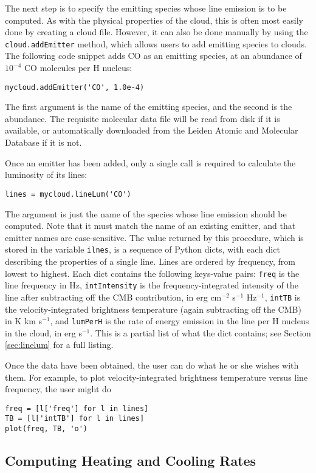 \documentclass[12pt]{article}
\begin{document}
The next step is to specify the emitting species whose line emission is to be computed. As with the physical properties of the cloud, this is often most easily done by creating a cloud file. However, it can also be done manually by using the \verb=cloud.addEmitter= method, which allows users to add emitting species to clouds. The following code snippet adds CO as an emitting species, at an abundance of $10^{-4}$ CO molecules per H nucleus:
\begin{verbatim}
mycloud.addEmitter('CO', 1.0e-4)
\end{verbatim}
The first argument is the name of the emitting species, and the second is the abundance. The requisite molecular data file will be read from disk if it is available, or automatically downloaded from the Leiden Atomic and Molecular Database if it is not.

Once an emitter has been added, only a single call is required to calculate the luminosity of its lines:
\begin{verbatim}
lines = mycloud.lineLum('CO')
\end{verbatim}
The argument is just the name of the species whose line emission should be computed. Note that it must match the name of an existing emitter, and that emitter names are case-sensitive. The value returned by this procedure, which is stored in the variable \verb=ilnes=, is a sequence of Python dicts, with each dict describing the properties of a single line. Lines are ordered by frequency, from lowest to highest. Each dict contains the following keys-value pairs: \verb=freq= is the line frequency in Hz, \verb=intIntensity= is the frequency-integrated intensity of the line after subtracting off the CMB contribution, in erg cm$^{-2}$ s$^{-1}$ Hz$^{-1}$, \verb=intTB= is the velocity-integrated brightness temperature (again subtracting off the CMB) in K km s$^{-1}$, and \verb=lumPerH= is the rate of energy emission in the line per H nucleus in the cloud, in erg s$^{-1}$. This is a partial list of what the dict contains; see Section \ref{sec:linelum} for a full listing.

Once the data have been obtained, the user can do what he or she wishes with them. For example, to plot velocity-integrated brightness temperature versus line frequency, the user might do
\begin{verbatim}
freq = [l['freq'] for l in lines]
TB = [l['intTB'] for l in lines]
plot(freq, TB, 'o')
\end{verbatim}

\subsection{Computing Heating and Cooling Rates}
\end{document}
